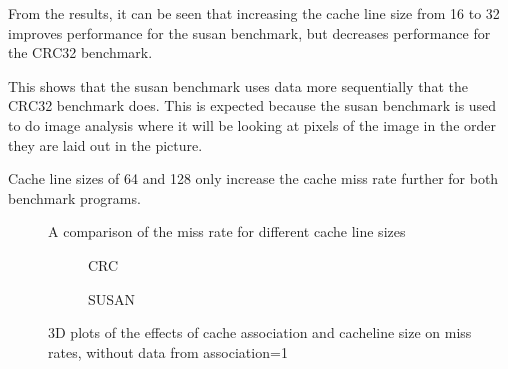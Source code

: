 From the results, it can be seen that increasing the cache line size from 16 to 32 
improves performance for the susan benchmark, but decreases performance for the CRC32 
benchmark. 

This shows that the susan benchmark uses data more sequentially that the CRC32 benchmark 
does.
This is expected because the susan benchmark is used to do image analysis where it will be 
looking at pixels of the image in the order they are laid out in the picture.

Cache line sizes of 64 and 128 only increase the cache miss rate further for 
both benchmark programs.

\begin{figure}[H]
    \centering
    
    \caption{A comparison of the miss rate for different cache line sizes}
    \label{fig:partb-cacheln}
\end{figure}

\begin{figure}[H]
\begin{subfigure}{.5\textwidth}
    \centering
    
    \caption{CRC}
    \label{fig:partb-2d-crc}
\end{subfigure}
\begin{subfigure}{.5\textwidth}
    \centering
    
    \caption{SUSAN}
    \label{fig:partb-2d-susan}
\end{subfigure}
\caption{3D plots of the effects of cache association and cacheline size on miss rates, without data from association=1}
\end{figure}
